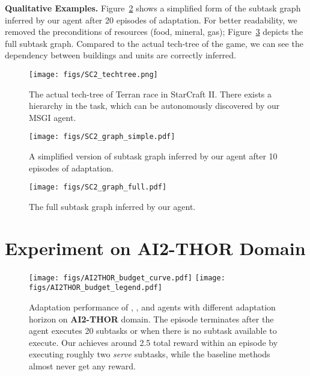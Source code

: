 \documentclass{article} \usepackage{iclr2020_conference,times}
\newcommand{\nti}{{MSGI}}
\begin{document}
\textbf{Qualitative Examples.}
Figure~\ref{fig:sc2_simplified_graph} shows a simplified form of the subtask graph inferred by our \NSGIGRProp agent
after 20 episodes of adaptation.
For better readability, we removed the preconditions of resources (food, mineral, gas);
Figure~\ref{fig:sc2_full_graph} depicts the full subtask graph.
Compared to the actual tech-tree of the game, we can see the dependency between buildings and units are correctly inferred.





\begin{figure}[t]
    \centering
    \texttt{[image: figs/SC2\_techtree.png]}
    \caption{The actual tech-tree of Terran race in StarCraft II.
    There exists a hierarchy in the task, which can be autonomously discovered by our \nti{} agent.}
    \label{fig:sc2_techtree}
    \vspace{-10pt}
\end{figure}

\begin{figure}[!p]
    \centering
    \texttt{[image: figs/SC2\_graph\_simple.pdf]}\vspace*{-5pt}
    \caption{
        A simplified version of subtask graph inferred by our \NSGIGRProp agent after 10 episodes of adaptation.
    }
    \label{fig:sc2_simplified_graph}
\end{figure}

\begin{figure}[!p]
    \vspace{-5pt}
    \centering
    \texttt{[image: figs/SC2\_graph\_full.pdf]}
    \vspace{-5pt}
    \caption{ The full subtask graph inferred by our \NSGI agent. }
    \label{fig:sc2_full_graph}
    \vspace{-10pt}
\end{figure}


\clearpage
\section{Experiment on AI2-THOR Domain}
\begin{figure}[!t]
    \centering
    \texttt{[image: figs/AI2THOR\_budget\_curve.pdf]}
    \texttt{[image: figs/AI2THOR\_budget\_legend.pdf]}
    \vspace*{-3pt}
    \caption{
        Adaptation performance of \NSGIGRProp, \Random, and \HRL agents with different adaptation horizon on \textbf{AI2-THOR} domain. The episode terminates after the agent executes 20 subtasks or when there is no subtask available to execute. Our \NSGIGRProp achieves around 2.5 total reward within an episode by executing roughly two \textit{serve} subtasks, while the baseline methods almost never get any reward.
    }
    \label{fig:thor_result}
\end{figure}
\end{document}

